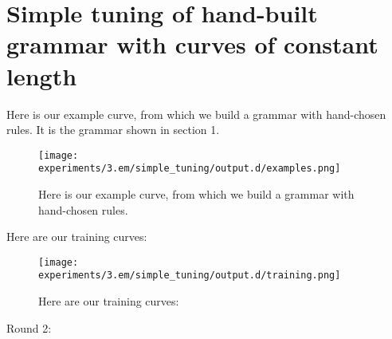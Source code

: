 \section{Simple tuning of hand-built grammar with curves of constant length}

Here is our example curve, from which we build a grammar with
hand-chosen rules. It is the grammar shown in section 1.

\begin{figure}
\texttt{[image: experiments/3.em/simple\_tuning/output.d/examples.png]}
\caption{Here is our example curve, from which we build a grammar with hand-chosen rules.}
\end{figure}

Here are our training curves:

\begin{figure}
\texttt{[image: experiments/3.em/simple\_tuning/output.d/training.png]}
\caption{Here are our training curves:}
\end{figure}

Round 2:


